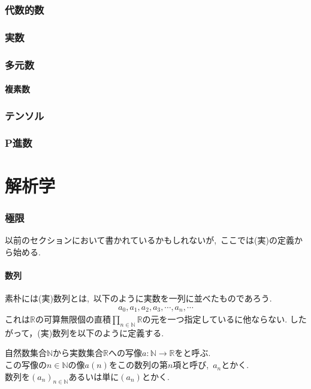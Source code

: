 \documentclass[hyperref,a4paper,12pt]{kininaruki}
\begin{document}
\section{代数的数}
\newpage
\section{実数}
\newpage
\section{多元数}
\subsection{複素数}
\newpage
\section{テンソル}
\newpage
\section{P進数}
\newpage
\part{解析学}
\section{極限}
以前のセクションにおいて書かれているかもしれないが,\, ここでは(実)の定義から始める.
\subsection{数列}
素朴には(実)数列とは,\, 以下のように実数を一列に並べたものであろう.
\begin{align}
    a_{0}, a_{1}, a_{2}, a_{3}, \cdots, a_{n}, \cdots
\end{align}
これは$\mathbb{R}$の可算無限個の直積$\displaystyle \prod_{n\in \mathbb{N}}\mathbb{R}$の元を一つ指定しているに他ならない.
したがって，(実)数列を以下のように定義する.
\begin{shadebox}
    自然数集合$\mathbb{N}$から実数集合$\mathbb{R}$への写像$a:\mathbb{N} \to \mathbb{R}$をと呼ぶ.\\
    この写像の$n\in \mathbb{N}$の像$a(n)$をこの数列の第$n$項と呼び,\, $a_{n}$とかく.\\
    数列を$(a_{n})_{n\in \mathbb{N}}$あるいは単に$(a_{n})$とかく.
\end{shadebox}
\end{document}
